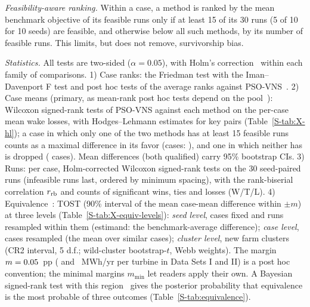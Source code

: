 \emph{Feasibility-aware ranking.} Within a case, a method is ranked by the mean benchmark objective of its feasible runs only if at least 15 of its 30 runs (5 of 10 for 10 seeds) are feasible, and otherwise below all such methods, by its number of feasible runs. This limits, but does not remove, survivorship bias.

\emph{Statistics.} All tests are two-sided ($\alpha=0.05$), with Holm's correction~\cite{Holm1979} within each family of comparisons. 1) Case ranks: the Friedman test with the Iman--Davenport F test and post hoc tests of the average ranks against PSO-VNS~\cite{Demsar2006,Derrac2011,LaTorre2021}. 2) Case means (primary, as mean-rank post hoc tests depend on the pool~\cite{Benavoli2016}): Wilcoxon signed-rank tests of PSO-VNS against each method on the per-case mean wake losses, with Hodges--Lehmann estimates for key pairs (Table~\ref{S-tab:X-hl}); a case in which only one of the two methods has at least 15 feasible runs counts as a maximal difference in its favor (cases: \NCmImputedPhrase), and one in which neither has is dropped (\NCmDropped{} cases). Mean differences (both qualified) carry 95\% bootstrap CIs. 3) Runs: per case, Holm-corrected Wilcoxon signed-rank tests on the 30 seed-paired runs (infeasible runs last, ordered by minimum spacing), with the rank-biserial correlation $r_{\rm rb}$ and counts of significant wins, ties and losses (W/T/L). 4) Equivalence~\cite{Lakens2017}: TOST (90\% interval of the mean case-mean difference within $\pm m$) at three levels (Table~\ref{S-tab:X-equiv-levels}): \emph{seed level}, cases fixed and runs resampled within them (estimand: the benchmark-average difference); \emph{case level}, cases resampled (the mean over similar cases); \emph{cluster level}, new farm clusters (CR2 interval, 5 d.f.; wild-cluster bootstrap-$t$, Webb weights). The margin $m=0.05$~pp (\NXMarginMWhTurbDsI{} and \NXMarginMWhTurbDsII~MWh/yr per turbine in Data Sets I and II) is a post hoc convention; the minimal margins $m_{\min}$ let readers apply their own. A Bayesian signed-rank test with this region~\cite{Benavoli2017} gives the posterior probability that equivalence is the most probable of three outcomes (Table~\ref{S-tab:equivalence}).

